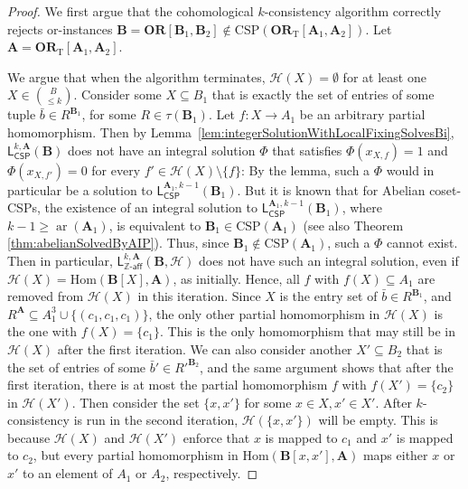 \documentclass[a4paper,english, thm-restate]{lipics-v2021}
\newcommand{\ZZ}{\mathbb{Z}}
\newcommand{\arity}[1]{\operatorname*{ar}(#1)}
\newcommand{\StructA}{\mathbf{A}}
\newcommand{\StructB}{\mathbf{B}}
\newcommand{\CSP}[1]{\mathrm{CSP}(#1)}
\newcommand{\Hom}[2]{\mathrm{Hom}(#1,#2)}
\newcommand{\leqs}{\mathsf{L}}
\newcommand{\cspiso}[3]{\leqs^{#1,#2}_{\mathsf{CSP}}(#3)}
\newcommand{\zafkleq}[4]{\leqs^{#1,#2}_{\ZZ\mathsf{\text{-}aff}}(#3,#4)}
\newcommand{\Hh}{\mathcal{H}}
\newcommand{\ORT}[1]{\mathbf{OR}_\text{T}[#1]}
\newcommand{\OR}[1]{\mathbf{OR}[#1]}
\begin{document}
	\cohomologySolvesCounterexample*		
	\begin{proof}
		We first argue that the cohomological $k$-consistency algorithm
		correctly rejects or-instances $\StructB=\OR{\StructB_1,\StructB_2} \notin \CSP{\ORT{\StructA_1, \StructA_2}}$. Let $\StructA = \ORT{\StructA_1, \StructA_2}$.
		
		We argue that when the algorithm terminates, $\Hh(X) = \emptyset$ for at least one $X \in \binom{B}{\leq k}$.
		Consider some $X \subseteq B_1$ that is exactly the set of entries of some tuple $\bar{b} \in R^{\StructB_1}$, for some $R \in \tau(\StructB_1)$.
		Let $f : X \to A_1$ be an arbitrary partial homomorphism. Then by Lemma~\ref{lem:integerSolutionWithLocalFixingSolvesBi}, $\cspiso{k}{\StructA}{\StructB}$ does not have an integral solution $\Phi$ that satisfies $\Phi(x_{X,f}) = 1$ and $\Phi(x_{X,f'}) = 0$ for every $f' \in \Hh(X) \setminus \{f\}$: By the lemma, such a $\Phi$ would in particular be a solution to $\cspiso{\StructA_1}{k-1}{\StructB_1}$. 
		But it is known that for Abelian coset-CSPs, the existence of an integral solution to $\cspiso{\StructA_1}{k-1}{\StructB_1}$, where $k-1 \geq \arity{\StructA_1}$, is equivalent to $\StructB_1 \in \CSP{\StructA_1}$ (see also Theorem \ref{thm:abelianSolvedByAIP}). Thus, since $\StructB_1 \notin \CSP{\StructA_1}$, such a $\Phi$ cannot exist.
		Then in particular, $\zafkleq{k}{\StructA}{\StructB}{\Hh}$ does not have such an integral solution, even if $\Hh(X) = \Hom{\StructB[X]}{\StructA}$, as initially. 
		Hence, all $f$ with $f(X) \subseteq A_1$ are removed from $\Hh(X)$ in this iteration. Since $X$ is the entry set of $\bar{b} \in R^{\StructB_1}$, and $R^{\StructA} \subseteq A_1^3 \cup \{(c_1,c_1,c_1)\}$, the only other partial homomorphism in $\Hh(X)$ is the one with $f(X) = \{c_1\}$. This is the only homomorphism that may still be in $\Hh(X)$ after the first iteration.
		We can also consider another $X' \subseteq B_{2}$ that is the set of entries of some $\bar{b}' \in R'^{\StructB_2}$, and the same argument shows that after the first iteration, there is at most the partial homomorphism $f$ with $f(X') = \{c_2\}$ in $\Hh(X')$.
		Then consider the set $\{x,x'\}$ for some $x \in X, x' \in X'$. 
		After $k$-consistency is run in the second iteration, $\Hh(\{x,x'\})$ will be empty. This is because $\Hh(X)$ and $\Hh(X')$ enforce that $x$ is mapped to $c_1$ and $x'$ is mapped to $c_2$, but every partial homomorphism in $\Hom{\StructB[x,x']}{\StructA}$ maps either $x$ or $x'$ to an element of $A_1$ or $A_2$, respectively. 
		

\end{proof}
\end{document}

